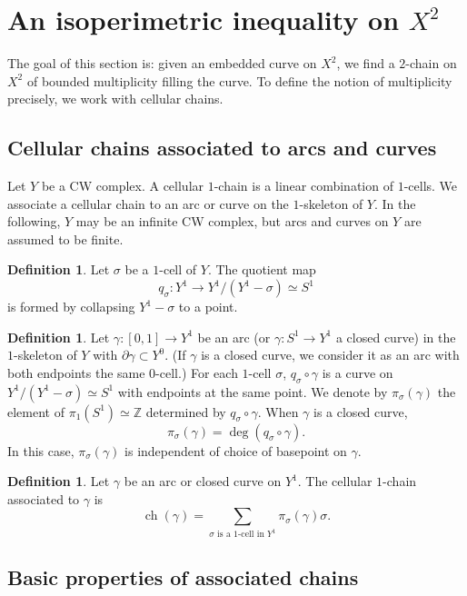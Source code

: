 \documentclass[12pt]{amsart}
\DeclareMathOperator*{\ch}{ch}
\theoremstyle{definition}
\newtheorem{definition}[theorem]{Definition}
\begin{document}
\section{An isoperimetric inequality on $X^2$} \label{isoperimetric section} 

The goal of this section is: given an embedded curve on $X^2$, we find a $2$-chain on $X^2$ of bounded multiplicity filling the curve. To define the notion of multiplicity precisely, we work with cellular chains. 

\subsection{Cellular chains associated to arcs and curves} Let $Y$ be a CW complex. A cellular $1$-chain is a linear combination of $1$-cells. We associate a cellular chain to an arc or curve on the $1$-skeleton of $Y$. In the following, $Y$ may be an infinite CW complex, but arcs and curves on $Y$ are assumed to be finite.

\begin{definition} Let $\sigma$ be a $1$-cell of $Y$. The quotient map $$q_{\sigma}:Y^1\to Y^1/(Y^1-\sigma)\simeq S^1$$ is formed by collapsing $Y^1-\sigma$ to a point. 
\end{definition}

\begin{definition}\label{coefficients of ch} Let $\gamma:[0,1]\to Y^1$ be an arc (or $\gamma:S^1\to Y^1$ a closed curve) in the $1$-skeleton of $Y$ with $\partial \gamma\subset Y^0$. (If $\gamma$ is a closed curve, we consider it as an arc with both endpoints the same $0$-cell.) For each $1$-cell $\sigma$, $q_\sigma\circ \gamma$ is a curve on $Y^1/(Y^1-\sigma)\simeq S^1$ with endpoints at the same point. We denote by $\pi_\sigma(\gamma)$ the element of $\pi_1(S^1)\simeq \mathbb{Z}$ determined by $q_\sigma\circ \gamma$. When $\gamma$ is a closed curve, $$\pi_\sigma(\gamma)=\deg(q_\sigma\circ \gamma).$$ In this case, $\pi_\sigma(\gamma)$ is independent of choice of basepoint on $\gamma$.
\end{definition}

\begin{definition}\label{ch} Let $\gamma$ be an arc or closed curve on $Y^1$. The cellular $1$-chain associated to $\gamma$ is $$\ch(\gamma)=\sum_{\sigma \text{ is a }1\text{-cell in } Y^1}\pi_\sigma(\gamma)\sigma.$$
\end{definition}

\subsection{Basic properties of associated chains}
\end{document}
